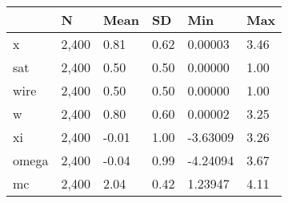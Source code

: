 \begin{table}[htbp]
\begin{tabular}{|l|l|l|l|l|l|}\hline  
 & N  & Mean  & SD  & Min  & Max  \\ \hline  
x &     2,400 &      0.81 &      0.62 &   0.00003 &      3.46 \\ \hline 
sat &     2,400 &      0.50 &      0.50 &   0.00000 &      1.00 \\ \hline 
wire &     2,400 &      0.50 &      0.50 &   0.00000 &      1.00 \\ \hline 
w &     2,400 &      0.80 &      0.60 &   0.00002 &      3.25 \\ \hline 
xi &     2,400 &     -0.01 &      1.00 &  -3.63009 &      3.26 \\ \hline 
omega &     2,400 &     -0.04 &      0.99 &  -4.24094 &      3.67 \\ \hline 
mc &     2,400 &      2.04 &      0.42 &   1.23947 &      4.11 \\ \hline 
  \end{tabular}
\end{table}
